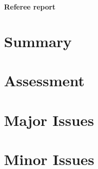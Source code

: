 \documentclass[12pt,a4paper]{amsart}
\numberwithin{equation}{section}
\newcommand{\reportissue}[3]{\item \textit{#1}\par\begin{quote}#2\end{quote}#3\par}
\begin{document}
\begin{center}\textbf{Referee report}\end{center}
\section*{Summary}
\section*{Assessment}
\section*{Major Issues}
\section*{Minor Issues}
\end{document}
